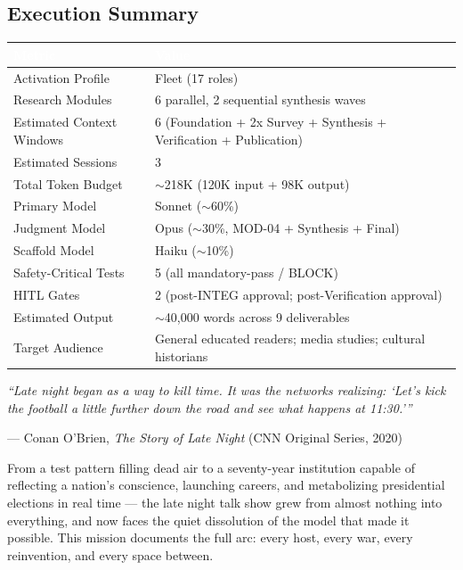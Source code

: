 \documentclass[11pt,letterpaper]{article}
\newcommand{\tableheader}[1]{\textbf{\sffamily\textcolor{white}{#1}}}
\begin{document}
\subsection{Execution Summary}

\begin{center}
\begin{tabularx}{\textwidth}{L{4.5cm}X}
\toprule
{}
\tableheader{Metric} & \tableheader{Value} \\
\midrule
Activation Profile & Fleet (17 roles) \\
Research Modules & 6 parallel, 2 sequential synthesis waves \\
Estimated Context Windows & 6 (Foundation + 2x Survey + Synthesis + Verification + Publication) \\
Estimated Sessions & 3 \\
Total Token Budget & $\sim$218K (120K input + 98K output) \\
Primary Model & Sonnet ($\sim$60\%) \\
Judgment Model & Opus ($\sim$30\%, MOD-04 + Synthesis + Final) \\
Scaffold Model & Haiku ($\sim$10\%) \\
Safety-Critical Tests & 5 (all mandatory-pass / BLOCK) \\
HITL Gates & 2 (post-INTEG approval; post-Verification approval) \\
Estimated Output & $\sim$40,000 words across 9 deliverables \\
Target Audience & General educated readers; media studies; cultural historians \\
\bottomrule
\end{tabularx}
\end{center}

\vspace{1.5em}

\begin{quotebox}
\textit{``Late night began as a way to kill time. It was the networks realizing: `Let's kick the football a little further down the road and see what happens at 11:30.'''}

\medskip
--- Conan O'Brien, \textit{The Story of Late Night} (CNN Original Series, 2020)

\medskip
\noindent From a test pattern filling dead air to a seventy-year institution capable of reflecting a nation's conscience, launching careers, and metabolizing presidential elections in real time --- the late night talk show grew from almost nothing into everything, and now faces the quiet dissolution of the model that made it possible. This mission documents the full arc: every host, every war, every reinvention, and every space between.
\end{quotebox}
\end{document}
